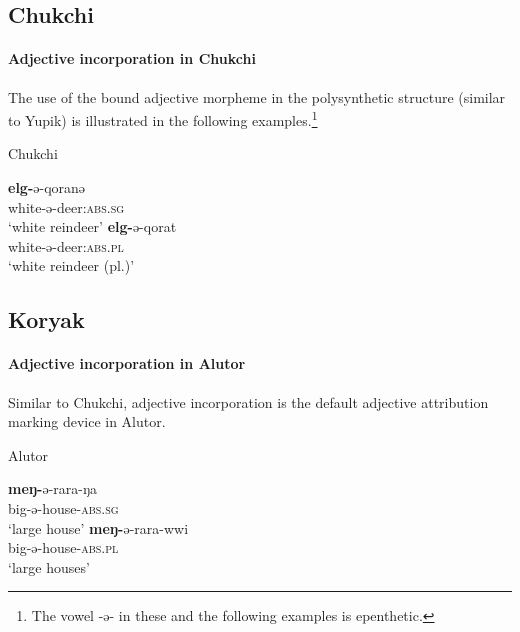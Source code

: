 \subsection{Chukchi}
\paragraph*{Adjective incorporation in Chukchi}
The use of the bound adjective morpheme in the polysynthetic structure (similar to Yupik) is illustrated in the following examples.\footnote{The vowel -ə- in these and the following examples is epenthetic.}
\begin{exe}
\ex \rm{Chukchi \citep{skorik1960}}
\begin{xlist}
\ex	
\gll	\textbf{elg-}ə-qoranə\\
	white-ə-deer:\textsc{abs.sg}\\
\glt	‘white reindeer’
\ex
\gll	\textbf{elg-}ə-qorat\\
	white-ə-deer:\textsc{abs.pl}\\
\glt	‘white reindeer (pl.)’
\end{xlist}
\end{exe}

\subsection{Koryak}
\paragraph*{Adjective incorporation in Alutor}
Similar to Chukchi, adjective incorporation is the default adjective attribution marking device in Alutor.
\begin{exe}
\ex \rm{Alutor \citep{nagayama2003}}
\begin{xlist}
\ex
\gll	\textbf{meŋ-}ə-rara-ŋa\\
	big-ə-house-\textsc{abs.sg}\\
\glt	‘large house’
\ex
\gll	\textbf{meŋ-}ə-rara-wwi\\
	big-ə-house-\textsc{abs.pl}\\
\glt	‘large houses’
\end{xlist}
\end{exe}

